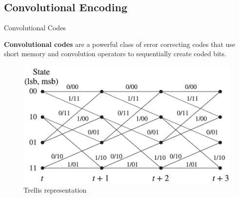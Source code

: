 \documentclass{beamer}
\newcommand{\<}				{\langle}
\renewcommand{\>}      		{\rangle}
\begin{document}
\subsection{Convolutional Encoding} 

\begin{frame}{Convolutional Codes}

\textbf{Convolutional codes} are a powerful class of error correcting codes that use short memory and convolution operators to sequentially create coded bits. 

\medskip

\begin{figure}[h]
\centering
\includegraphics[scale=0.25]{trellis.png}
\caption{Trellis representation}
\end{figure}






\end{frame}

\end{document}

